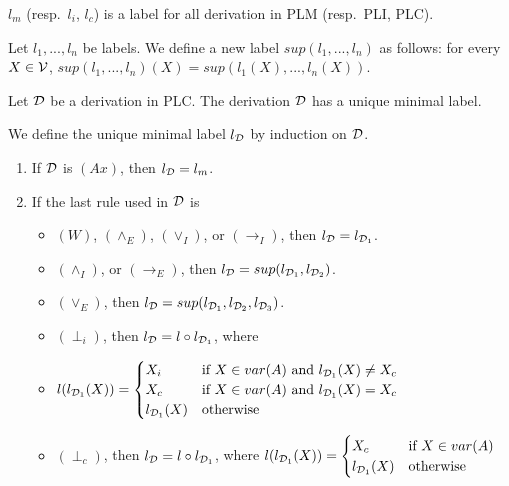 \documentclass{jancl}
\begin{document}
\begin{remark}  {$l_m$ (resp.\ $l_i$, $l_c$) is a label for all
 derivation in {\rm PLM} (resp.\ {\rm PLI}, {\rm PLC}).}
\end{remark}

\begin{definition}
Let $l_1,...,l_n$ be labels. We define a new label
$sup(l_1,...,l_n)$ as follows: for every $X \in {\cal V}$,
$sup(l_1,...,l_n)(X) = sup(l_1(X),...,l_n(X))$.
\end{definition}

\begin{theorem} \label{decdem}
Let ${\cal D}$ be a derivation in {\rm PLC}. The derivation ${\cal D}$ has a
unique minimal label.
\end{theorem}

\begin{proof*}
We define the unique minimal label $l_{\cal D}$ by induction on
${\cal D}$.
\begin{enumerate}
\item If ${\cal D}$ is $(Ax)$, then $l_{\cal D} = l_m$.

\item If the last rule used in ${\cal D}$ is
    \begin{itemize}
    \item $(W)$, $({\wedge}_E)$, $({\vee}_I)$, or $({\rightarrow}_I)$, then $l_{\cal D} =
    l_{{\cal D}_1}$.

    \item  $({\wedge}_I)$, or $({\rightarrow}_E)$, then $l_{\cal D} = sup(l_{{\cal
    D}_1},l_{{\cal D}_2})$.

    \item $({\vee}_E)$, then $l_{\cal D} = sup(l_{{\cal
    D}_1},l_{{\cal D}_2},l_{{\cal D}_3})$.

    \item $(\perp_i)$, then $l_{\cal D} = l \circ l_{{\cal
    D}_1}$, where
    \item[] $l(l_{{\cal D}_1}(X)) =
    \begin{cases}
    X_i & \text{if }X \in var(A) \text{ and }l_{{\cal D}_1}(X) \not =
    X_c\\
        X_c & \text{if }X \in var(A) \text{ and }l_{{\cal D}_1}(X) = X_c\\
        l_{{\cal D}_1}(X) & \text{otherwise }
    \end{cases}$

    \item $(\perp_c)$, then $l_{\cal D} = l \circ l_{{\cal D}_1}$,
    where $l(l_{{\cal D}_1}(X)) =
    \begin{cases}
    X_c     &   \text{if }X \in var(A)\\
    l_{{\cal D}_1}(X) & \text{otherwise }
    \end{cases}$
    \end{itemize}
\end{enumerate}
\end{proof*}
\end{document}
